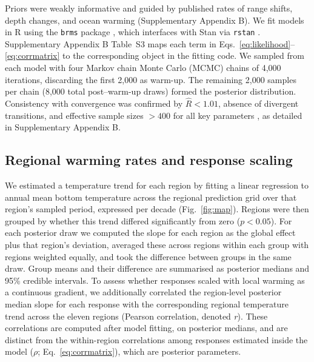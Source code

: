 \documentclass[9pt,twocolumn,twoside]{pnas-new}
\begin{document}
{Priors were weakly informative and guided by published rates of range shifts, depth changes, and ocean warming (Supplementary Appendix B). We fit models in R using the \texttt{brms} package \citep{burkner_brms_2017}, which interfaces with Stan via \texttt{rstan} \citep{stan2024,stan_development_team_rstan_2024}. Supplementary Appendix B Table~S3 maps each term in Eqs.~\ref{eq:likelihood}--\ref{eq:corrmatrix} to the corresponding object in the fitting code. We sampled from each model with four Markov chain Monte Carlo (MCMC) chains of 4,000 iterations, discarding the first 2,000 as warm-up. The remaining 2,000 samples per chain (8,000 total post–warm-up draws) formed the posterior distribution. Consistency with convergence was confirmed by $\hat{R} < 1.01$, absence of divergent transitions, and effective sample sizes $> 400$ for all key parameters \citep{vehtari_rank-normalization_2021}, as detailed in Supplementary Appendix B.

\subsection*{Regional warming rates and response scaling}
We estimated a temperature trend for each region by fitting a linear regression to annual mean bottom temperature across the regional prediction grid over that region's sampled period, expressed per decade (Fig.~\ref{fig:map}). Regions were then grouped by whether this trend differed significantly from zero ($p < 0.05$). For each posterior draw we computed the slope for each region as the global effect plus that region's deviation, averaged these across regions within each group with regions weighted equally, and took the difference between groups in the same draw. Group means and their difference are summarised as posterior medians and 95\% credible intervals. To assess whether responses scaled with local warming as a continuous gradient, we additionally correlated the region-level posterior median slope for each response with the corresponding regional temperature trend across the eleven regions (Pearson correlation, denoted \textit{r}). These correlations are computed after model fitting, on posterior medians, and are distinct from the within-region correlations among responses estimated inside the model ($\rho$; Eq.~\ref{eq:corrmatrix}), which are posterior parameters.
}


\showmatmethods{} %

\end{document}
